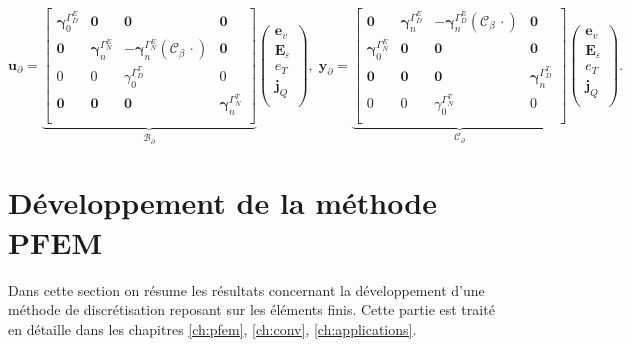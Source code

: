 \begin{equation*}
\bm{u}_\partial = 
\underbrace{\begin{bmatrix}
	\bm{\gamma}_{0}^{\Gamma_D^E} & \bm{0} & \bm{0} & \bm{0} \\
	\bm{0} & \bm{\gamma}_n^{\Gamma_N^E} & - \bm{\gamma}_n^{\Gamma_N^E}(\bm{\mathcal{C}}_\beta\, \cdot )  & \bm{0}  \\ 
	{0} & {0} & {\gamma}_{0}^{\Gamma_D^T} & {0} \\
	\bm{0} & \bm{0} & \bm{0} & \bm{\gamma}_{n}^{\Gamma_N^T} \\
	\end{bmatrix}}_{\mathcal{B}_\partial}
\begin{pmatrix}
\bm{e}_v \\
\bm{E}_\varepsilon \\
{e}_T \\
\bm{j}_Q \\
\end{pmatrix}, \; 
\bm{y}_\partial = 
\underbrace{\begin{bmatrix}
	\bm{0} & \bm{\gamma}_n^{\Gamma_D^E} & - \bm{\gamma}_n^{\Gamma_D^E}(\bm{\mathcal{C}}_\beta\, \cdot )  & \bm{0}  \\ 
	\bm{\gamma}_{0}^{\Gamma_N^E} & \bm{0} & \bm{0} & \bm{0} \\
	\bm{0} & \bm{0} & \bm{0} & \bm{\gamma}_{n}^{\Gamma_D^T} \\
	{0} & {0} & {\gamma}_{0}^{\Gamma_N^T} & {0} \\
	\end{bmatrix}}_{\mathcal{C}_\partial}
\begin{pmatrix}
\bm{e}_v \\
\bm{E}_\varepsilon \\
{e}_T \\
\bm{j}_Q \\
\end{pmatrix}.
\end{equation*} 

\section{Développement de la méthode PFEM}
Dans cette section on résume les résultats concernant la développement d'une méthode de discrétisation reposant sur les éléments finis. Cette partie est traité en détaille dans les chapitres \ref{ch:pfem}, \ref{ch:conv}, \ref{ch:applications}. \\

